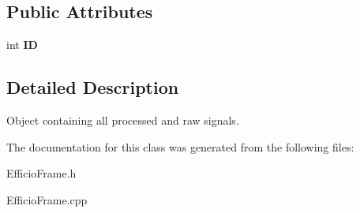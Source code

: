 \subsection*{Public Attributes}
\begin{DoxyCompactItemize}
\item 
int {\bfseries ID}\hypertarget{class_efficio_1_1_efficio_frame_aa994a72ec58afb3b6b64b9e05a9d0ba9}{}\label{class_efficio_1_1_efficio_frame_aa994a72ec58afb3b6b64b9e05a9d0ba9}

\end{DoxyCompactItemize}


\subsection{Detailed Description}
Object containing all processed and raw signals. 

The documentation for this class was generated from the following files\+:\begin{DoxyCompactItemize}
\item 
Efficio\+Frame.\+h\item 
Efficio\+Frame.\+cpp\end{DoxyCompactItemize}

